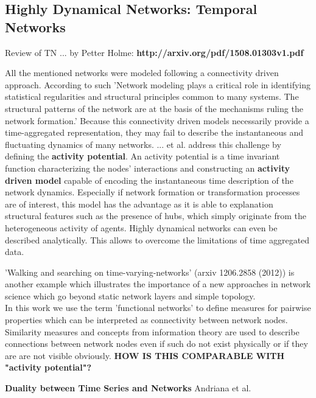\documentclass[a4paper,10pt]{scrbook}
\begin{document}
\subsection{Highly Dynamical Networks: Temporal Networks}


Review of TN ... by Petter Holme: 
\textbf{http://arxiv.org/pdf/1508.01303v1.pdf}

All the mentioned networks were modeled following a connectivity driven approach. According to 
such 'Network modeling plays a critical role in identifying statistical regularities and structural principles common to many systems. The structural patterns of the network are at the basis of the mechanisms ruling the network formation.' Because this connectivity driven models necessarily provide a time-aggregated representation,  they may fail to describe the instantaneous and fluctuating dynamics of many networks. ... et al. address this challenge by defining the \textbf{activity potential}. An activity potential is a time invariant function characterizing the nodes' interactions and constructing an \textbf{activity driven model} capable of encoding the instantaneous time description of the network dynamics. Especially if network formation or transformation processes are of interest, this model has the advantage as it is able to explanation structural features such as the presence of hubs, which simply originate from the heterogeneous activity of agents. Highly dynamical networks can even be described analytically. This allows to overcome the limitations of time aggregated data.

'Walking and searching on time-varying-networks' (arxiv 1206.2858 (2012)) is another example which illustrates the importance of a new approaches in network science which go beyond static network layers and simple topology.\\

In this work we use the term 'functional networks' to define measures for pairwise properties which can be interpreted as connectivity between network nodes. Similarity measures and concepts from information theory are used to describe connections between network nodes even if such do not exist physically or if they are are not visible obviously.
\textbf{HOW IS THIS COMPARABLE WITH "activity potential"?}


\textbf{Duality between Time Series and Networks}
Andriana et al.  \cite{Andriana2011}
\end{document}
